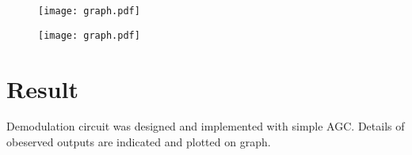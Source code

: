 \begin{figure}
	\texttt{[image: graph.pdf]}
\end{figure}

\begin{figure}
	\texttt{[image: graph.pdf]}
\end{figure}


\section*{Result}

Demodulation circuit was designed and implemented with simple AGC. Details of obeserved outputs are indicated and plotted on graph.
